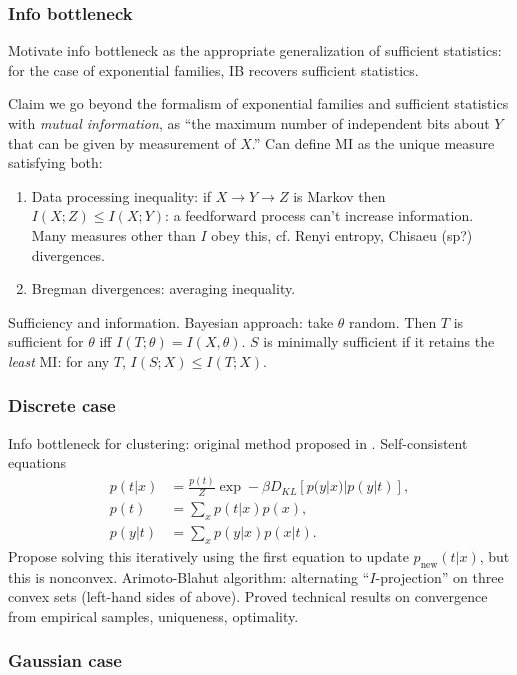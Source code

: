 \documentclass[notitlepage,openany,11pt]{report}
\theoremstyle{plain}%
\numberwithin{equation}{section}
\begin{document}
\subsubsection{Info bottleneck}
Motivate info bottleneck as the appropriate generalization of sufficient statistics: for the case of exponential families, IB recovers sufficient statistics.

Claim we go beyond the formalism of exponential families and sufficient statistics with \emph{mutual information}, as ``the maximum number of independent bits about $Y$ that can be given by measurement of $X$.'' Can define MI as the unique measure satisfying both:
\begin{enumerate}
\item Data processing inequality: if $X \rightarrow Y \rightarrow Z$ is Markov then $I(X;Z) \leq I(X;Y)$: a feedforward process can't increase information. Many measures other than $I$ obey this, cf. Renyi entropy, Chisaeu (sp?) divergences.
\item Bregman divergences: averaging inequality.
\end{enumerate}

Sufficiency and information. Bayesian approach: take $\theta$ random. Then $T$ is sufficient for $\theta$ iff $I(T;\theta) = I(X, \theta)$. $S$ is minimally sufficient if it retains the \emph{least} MI: for any $T$, $I(S;X) \leq I(T;X)$.

\subsubsection{Discrete case} 
Info bottleneck for clustering: original method proposed in \cite{TishbyEtAl:99}. Self-consistent equations
\begin{align*}
p(t|x) &= \frac{p(t)}{Z} \exp -\beta D_{KL}[p(y|x) | p(y|t)], \\
p(t) &= \sum_{x} p(t|x) p(x), \\
p(y|t) &= \sum_{x} p(y|x) p(x|t).
\end{align*}
Propose solving this iteratively using the first equation to update $p_{\text{new}}(t|x)$, but this is nonconvex. Arimoto-Blahut algorithm: alternating ``$I$-projection'' on three convex sets (left-hand sides of above). Proved technical results on convergence from empirical samples, uniqueness, optimality. 

\subsubsection{Gaussian case} 
\end{document}
